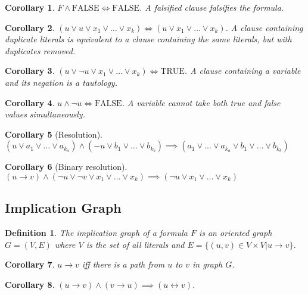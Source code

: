 \documentclass[12pt]{article}
\newtheorem{definition}{Definition}
\newtheorem{corollary}{Corollary}
\newcommand{\T}{\text{TRUE}}
\newcommand{\F}{\text{FALSE}}
\begin{document}
\begin{corollary}
$F \land \F \iff \F$. A falsified clause falsifies the formula.
\end{corollary}

\begin{corollary}
$(u \lor u \lor x_1 \lor \ldots \lor x_k) \iff (u \lor x_1 \lor \ldots \lor x_k)$.
A clause containing duplicate literals is equivalent to a clause containing the same literals,
but with duplicates removed.
\end{corollary}

\begin{corollary}
$(u \lor \neg u \lor x_1 \lor \ldots \lor x_k) \iff \T$.
A clause containing a variable and its negation is a tautology.
\end{corollary}

\begin{corollary}
$u \land \neg u \iff \F$. A variable cannot take both true and false values simultaneously.
\end{corollary}

\begin{corollary}[Resolution]
$(u \lor a_1 \lor \ldots \lor a_{k_a}) \land (-u \lor b_1 \lor \ldots \lor b_{k_b}) \implies (a_1 \lor \ldots \lor a_{k_a} \lor b_1 \lor \ldots \lor b_{k_b})$
\end{corollary}

\begin{corollary}[Binary resolution]
\label{cor:binary-resolution}
$(u \rightarrow v) \land (\neg u \lor \neg v \lor x_1 \lor \ldots \lor x_k) \implies (\neg u \lor x_1 \lor \ldots \lor x_k)$
\end{corollary}


\subsection{Implication Graph}

\begin{definition}
The \emph{implication graph} of a formula $F$ is an oriented graph $G = (V, E)$ where $V$ is the
set of all literals and $E = \{(u, v) \in V \times V | u \rightarrow v\}$.
\end{definition}

\begin{corollary}
$u \rightarrow v$ iff there is a path from $u$ to $v$ in graph $G$.
\end{corollary}

\begin{corollary}
$(u \rightarrow v) \land (v \rightarrow u) \implies (u \leftrightarrow v)$.
\end{corollary}
\end{document}
